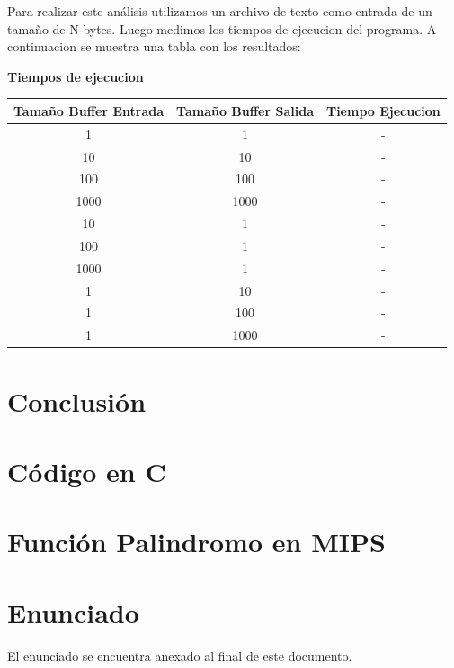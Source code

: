 \documentclass[11pt,a4paper]{article}
\begin{document}
Para realizar este análisis utilizamos un archivo de texto como entrada de un tamaño de N bytes. Luego medimos los tiempos de ejecucion del programa. A continuacion se muestra una tabla con los resultados:

\begin{table}[h]
	\centering
	\textbf{Tiempos de ejecucion}\\
	\begin{tabular}{|c|c|c|}
		\hline
		Tamaño Buffer Entrada & Tamaño Buffer Salida & Tiempo Ejecucion \\
		\hline
		1 & 1 & - \\
		\hline
		10 & 10 & - \\
		\hline
		100 & 100 & - \\
		\hline
		1000 & 1000 & - \\
		\hline
		10 & 1 & - \\
		\hline
		100 & 1 & - \\
		\hline
		1000 & 1 & - \\
		\hline
		1 & 10 & - \\
		\hline
		1 & 100 & - \\
		\hline
		1 & 1000 & - \\
		\hline
	\end{tabular}
\end{table}

\section{Conclusión}



\section{Código en C}



\section{Función Palindromo en MIPS}


\section{Enunciado}
El enunciado se encuentra anexado al final de este documento.
\end{document}
